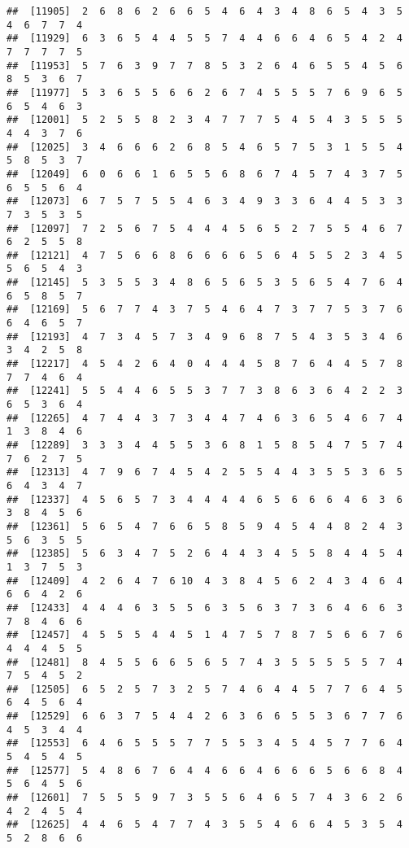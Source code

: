 \documentclass[
]{book}
\begin{document}
\begin{verbatim}
##  [11905]  2  6  8  6  2  6  6  5  4  6  4  3  4  8  6  5  4  3  5  4  6  7  7  4
##  [11929]  6  3  6  5  4  4  5  5  7  4  4  6  6  4  6  5  4  2  4  7  7  7  7  5
##  [11953]  5  7  6  3  9  7  7  8  5  3  2  6  4  6  5  5  4  5  6  8  5  3  6  7
##  [11977]  5  3  6  5  5  6  6  2  6  7  4  5  5  5  7  6  9  6  5  6  5  4  6  3
##  [12001]  5  2  5  5  8  2  3  4  7  7  7  5  4  5  4  3  5  5  5  4  4  3  7  6
##  [12025]  3  4  6  6  6  2  6  8  5  4  6  5  7  5  3  1  5  5  4  5  8  5  3  7
##  [12049]  6  0  6  6  1  6  5  5  6  8  6  7  4  5  7  4  3  7  5  6  5  5  6  4
##  [12073]  6  7  5  7  5  5  4  6  3  4  9  3  3  6  4  4  5  3  3  7  3  5  3  5
##  [12097]  7  2  5  6  7  5  4  4  4  5  6  5  2  7  5  5  4  6  7  6  2  5  5  8
##  [12121]  4  7  5  6  6  8  6  6  6  6  5  6  4  5  5  2  3  4  5  5  6  5  4  3
##  [12145]  5  3  5  5  3  4  8  6  5  6  5  3  5  6  5  4  7  6  4  6  5  8  5  7
##  [12169]  5  6  7  7  4  3  7  5  4  6  4  7  3  7  7  5  3  7  6  6  4  6  5  7
##  [12193]  4  7  3  4  5  7  3  4  9  6  8  7  5  4  3  5  3  4  6  3  4  2  5  8
##  [12217]  4  5  4  2  6  4  0  4  4  4  5  8  7  6  4  4  5  7  8  7  7  4  6  4
##  [12241]  5  5  4  4  6  5  5  3  7  7  3  8  6  3  6  4  2  2  3  6  5  3  6  4
##  [12265]  4  7  4  4  3  7  3  4  4  7  4  6  3  6  5  4  6  7  4  1  3  8  4  6
##  [12289]  3  3  3  4  4  5  5  3  6  8  1  5  8  5  4  7  5  7  4  7  6  2  7  5
##  [12313]  4  7  9  6  7  4  5  4  2  5  5  4  4  3  5  5  3  6  5  6  4  3  4  7
##  [12337]  4  5  6  5  7  3  4  4  4  4  6  5  6  6  6  4  6  3  6  3  8  4  5  6
##  [12361]  5  6  5  4  7  6  6  5  8  5  9  4  5  4  4  8  2  4  3  5  6  3  5  5
##  [12385]  5  6  3  4  7  5  2  6  4  4  3  4  5  5  8  4  4  5  4  1  3  7  5  3
##  [12409]  4  2  6  4  7  6 10  4  3  8  4  5  6  2  4  3  4  6  4  6  6  4  2  6
##  [12433]  4  4  4  6  3  5  5  6  3  5  6  3  7  3  6  4  6  6  3  7  8  4  6  6
##  [12457]  4  5  5  5  4  4  5  1  4  7  5  7  8  7  5  6  6  7  6  4  4  4  5  5
##  [12481]  8  4  5  5  6  6  5  6  5  7  4  3  5  5  5  5  5  7  4  7  5  4  5  2
##  [12505]  6  5  2  5  7  3  2  5  7  4  6  4  4  5  7  7  6  4  5  6  4  5  6  4
##  [12529]  6  6  3  7  5  4  4  2  6  3  6  6  5  5  3  6  7  7  6  4  5  3  4  4
##  [12553]  6  4  6  5  5  5  7  7  5  5  3  4  5  4  5  7  7  6  4  5  4  5  4  5
##  [12577]  5  4  8  6  7  6  4  4  6  6  4  6  6  6  5  6  6  8  4  5  6  4  5  6
##  [12601]  7  5  5  5  9  7  3  5  5  6  4  6  5  7  4  3  6  2  6  4  2  4  5  4
##  [12625]  4  4  6  5  4  7  7  4  3  5  5  4  6  6  4  5  3  5  4  5  2  8  6  6

\end{verbatim}
\end{document}
